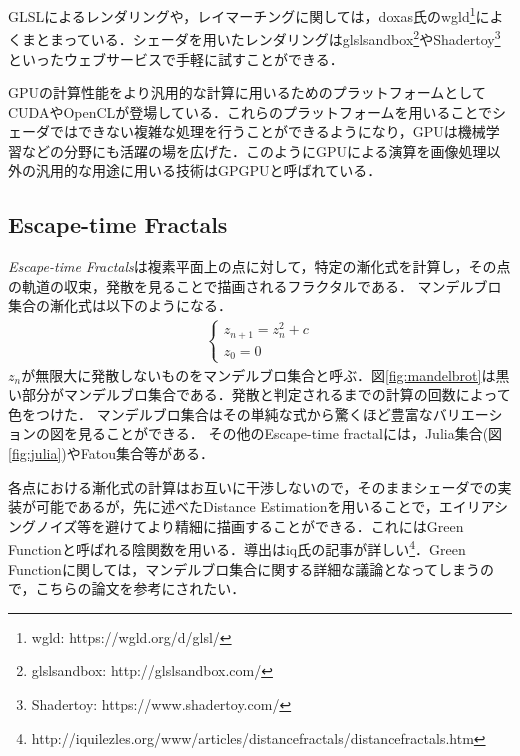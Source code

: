 GLSLによるレンダリングや，レイマーチングに関しては，doxas氏のwgld\footnote{wgld: https://wgld.org/d/glsl/}によくまとまっている．シェーダを用いたレンダリングはglslsandbox\footnote{glslsandbox: http://glslsandbox.com/}やShadertoy\footnote{Shadertoy: https://www.shadertoy.com/}といったウェブサービスで手軽に試すことができる．

GPUの計算性能をより汎用的な計算に用いるためのプラットフォームとしてCUDAやOpenCLが登場している．これらのプラットフォームを用いることでシェーダではできない複雑な処理を行うことができるようになり，GPUは機械学習などの分野にも活躍の場を広げた．このようにGPUによる演算を画像処理以外の汎用的な用途に用いる技術はGPGPUと呼ばれている．

\subsection{Escape-time Fractals}
{\it Escape-time Fractals}は複素平面上の点に対して，特定の漸化式を計算し，その点の軌道の収束，発散を見ることで描画されるフラクタルである．
マンデルブロ集合の漸化式は以下のようになる．
\begin{eqnarray*}
 \begin{cases}
  z_{n+1} = z^2_{n} + c \\ z_0 = 0
 \end{cases}
\end{eqnarray*}
$z_n$が無限大に発散しないものをマンデルブロ集合と呼ぶ．図\ref{fig:mandelbrot}は黒い部分がマンデルブロ集合である．発散と判定されるまでの計算の回数によって色をつけた．
マンデルブロ集合はその単純な式から驚くほど豊富なバリエーションの図を見ることができる．
その他のEscape-time fractalには，Julia集合(図\ref{fig:julia})やFatou集合等がある．

各点における漸化式の計算はお互いに干渉しないので，そのままシェーダでの実装が可能であるが，先に述べたDistance Estimationを用いることで，エイリアシングノイズ等を避けてより精細に描画することができる．これにはGreen Functionと呼ばれる陰関数を用いる．導出はiq氏の記事が詳しい\footnote{http://iquilezles.org/www/articles/distancefractals/distancefractals.htm}．Green Functionに関しては，マンデルブロ集合に関する詳細な議論となってしまうので，こちらの論文\cite{mandelbrot}を参考にされたい．

